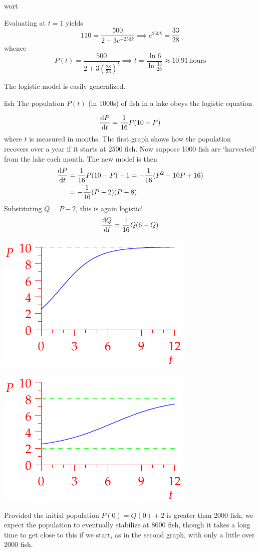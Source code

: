 \begin{example}{}{wort}
\begin{enumeratea}
	Evaluating at $t=1$ yields
	\[110=\frac{500}{2+3e^{-250k}} \implies e^{250k}=\frac{33}{28}\]
	whence
	\[P(t)=\frac{500}{2+3\left(\frac{28}{33}
	\right)^t} \implies t=\frac{\ln 6}{\ln\frac{33}{28}} \approx 10.91\,\text{hours}\]
  \end{enumeratea}
\end{example}


The logistic model is easily generalized.

\begin{example}{}{fish}
The population $P(t)$ (in 1000s) of fish in a lake obeys the logistic equation
\begin{minipage}[t]{0.6\linewidth}\vspace{-10pt}
\[\diff[P]{t}=\frac 1{16}P(10-P)\]
where $t$ is measured in months. The first graph shows how the population recovers over a year if it starts at 2500 fish.\smallbreak
Now suppose 1000 fish are `harvested' from the lake each month. The new model is then
\begin{align*}
\diff[P]{t}&=\frac 1{16}P(10-P)-1=-\frac 1{16}(P^2-10P+16)\\
&=-\frac 1{16}(P-2)(P-8)
\end{align*}
Substituting $Q=P-2$, this is again logistic!
\[\diff[Q]{t}=\frac 1{16}Q(6-Q)\]
\end{minipage}\hfill\begin{minipage}[t]{0.39\linewidth}\vspace{0pt}
\flushright\includegraphics{fish}\par
\includegraphics{fish2}
\end{minipage}
Provided the initial population $P(0)=Q(0)+2$ is greater than 2000 fish, we expect the population to eventually stabilize at 8000 fish, though it takes a long time to get close to this if we start, as in the second graph, with only a little over 2000 fish.
\end{example}
\goodbreak



